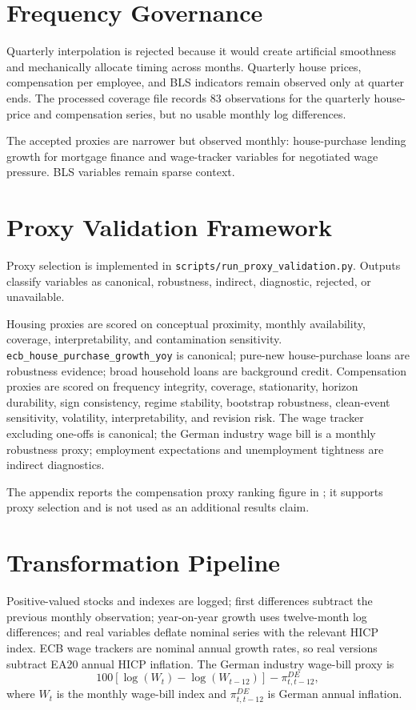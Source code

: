 \section{Frequency Governance}

Quarterly interpolation is rejected because it would create artificial smoothness and mechanically allocate timing across months. Quarterly house prices, compensation per employee, and BLS indicators remain observed only at quarter ends. The processed coverage file records 83 observations for the quarterly house-price and compensation series, but no usable monthly log differences.

The accepted proxies are narrower but observed monthly: house-purchase lending growth for mortgage finance and wage-tracker variables for negotiated wage pressure. BLS variables remain sparse context.

\section{Proxy Validation Framework}

Proxy selection is implemented in \nolinkurl{scripts/run_proxy_validation.py}. Outputs classify variables as canonical, robustness, indirect, diagnostic, rejected, or unavailable.

Housing proxies are scored on conceptual proximity, monthly availability, coverage, interpretability, and contamination sensitivity. \nolinkurl{ecb_house_purchase_growth_yoy} is canonical; pure-new house-purchase loans are robustness evidence; broad household loans are background credit. Compensation proxies are scored on frequency integrity, coverage, stationarity, horizon durability, sign consistency, regime stability, bootstrap robustness, clean-event sensitivity, volatility, interpretability, and revision risk. The wage tracker excluding one-offs is canonical; the German industry wage bill is a monthly robustness proxy; employment expectations and unemployment tightness are indirect diagnostics.

The appendix reports the compensation proxy ranking figure in ; it supports proxy selection and is not used as an additional results claim.

\section{Transformation Pipeline}

Positive-valued stocks and indexes are logged; first differences subtract the previous monthly observation; year-on-year growth uses twelve-month log differences; and real variables deflate nominal series with the relevant HICP index. ECB wage trackers are nominal annual growth rates, so real versions subtract EA20 annual HICP inflation. The German industry wage-bill proxy is
\begin{equation}
  100\left[\log(W_t) - \log(W_{t-12})\right] - \pi^{DE}_{t,t-12},
  \label{eq:real-wage-bill}
\end{equation}
where \(W_t\) is the monthly wage-bill index and \(\pi^{DE}_{t,t-12}\) is German annual inflation.

